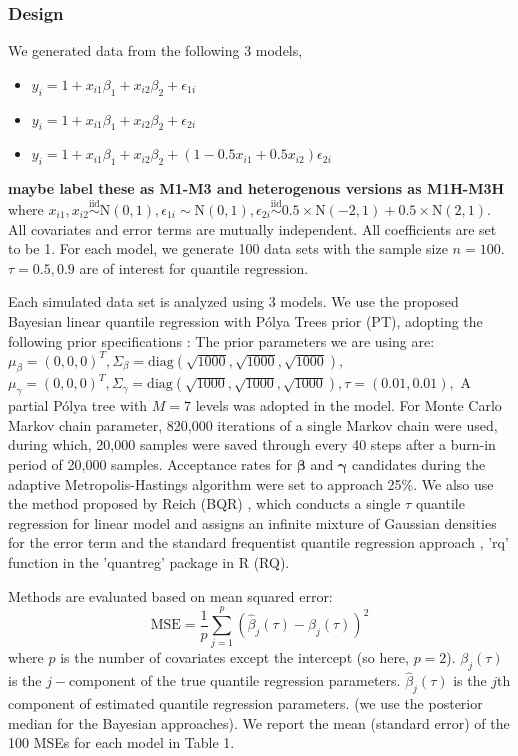 \documentclass[12pt]{article}
\newcommand{\polya}{P\'{o}lya}
\begin{document}
\subsubsection{Design}
We generated data from the following 3 models,
\begin{itemize}
\item [M1:] $y_i = 1 + x_{i1}\beta_1 + x_{i2}\beta_2 + \epsilon_{1i}$
\item [M2:] $y_i = 1 + x_{i1}\beta_1 + x_{i2}\beta_2 + \epsilon_{2i}$
\item [M3:]  $y_i = 1 + x_{i1}\beta_1 + x_{i2}\beta_2 +
  (1-0.5x_{i1}+0.5x_{i2}) \epsilon_{2i}$
\end{itemize}
{\bf maybe label these as M1-M3 and heterogenous versions as M1H-M3H}
where $x_{i1} , x_{i2} \stackrel{\text{iid}}{\sim} \mathrm{N}(0,1),
\epsilon_{1i} \sim \mathrm{N}(0,1), \epsilon_{2i} 
\stackrel{\text{iid}}{\sim} 0.5 \times \mathrm{N}(-2,1) + 
0.5 \times \mathrm{N}(2,1)
$. All covariates and error terms are mutually independent. All
coefficients are set to be 1. For each model, we generate 100 data
sets with the sample size $n=100$. $\tau=0.5, 0.9$ are of interest for
quantile regression. 

Each simulated data set is analyzed using 3 models. We use the proposed
Bayesian linear quantile regression with \polya{} Trees prior (PT),
adopting the following prior specifications : The prior
  parameters we are using are: $\mu_{\beta} = (0,0,0)^T, 
\Sigma_{\beta}=\text{diag} (\sqrt{1000},\sqrt{1000},\sqrt{1000}), $
$\mu_{\gamma} = (0,0,0)^T,  
\Sigma_{\gamma}=\text{diag} (\sqrt{1000},\sqrt{1000},\sqrt{1000}),
\tau=(0.01, 0.01), $ A partial \polya{} tree with $M=7$ levels was adopted
in the model. For Monte Carlo Markov chain parameter, 820,000
iterations of a single Markov chain were used, during which, 20,000
samples were saved through every 40 steps after a burn-in period of
20,000 samples. Acceptance rates for $\bm{\beta}$ and $\bm{\gamma}$ candidates
during the adaptive Metropolis-Hastings algorithm were set to approach
25\%. 
We also use the method proposed by Reich (BQR)  , which conducts a
single $\tau$ 
  quantile regression for linear model and assigns an infinite mixture
of Gaussian densities for the error term and the
standard frequentist quantile regression approach , 'rq' function in
the 'quantreg' package in R (RQ). 

Methods are evaluated  based on mean squared error: 
\begin{displaymath}
\text{MSE}  = \frac{1}{p} \sum_{j=1}^p (\hat{\beta}_j(\tau) - \beta_j(\tau))^2
\end{displaymath}
where $p$ is the number of covariates except the intercept (so here, $p=2$). $\beta_j(\tau)$ is the
$j-$component of the true quantile regression
parameters. $\hat{\beta}_j(\tau)$ is the  $j$th component of estimated
quantile regression parameters. (we use the posterior median for
the Bayesian approaches). We report the mean (standard error) of the 100
MSEs for each model in Table 1. 
\end{document}
